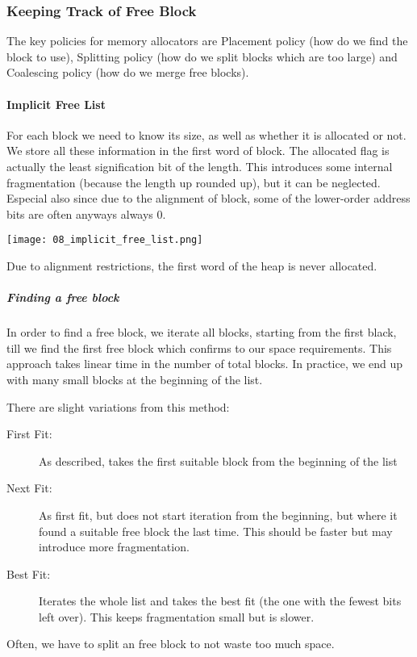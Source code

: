 \subsubsection{Keeping Track of Free Block}
The key policies for memory allocators are Placement policy (how do we find the block to use), Splitting policy (how do we split blocks which are too large) and Coalescing policy (how do we merge free blocks).

\paragraph{Implicit Free List}
For each block we need to know its size, as well as whether it is allocated or not. We store all these information in the first word of block. The allocated flag is actually the least signification bit of the length. This introduces some internal fragmentation (because the length up rounded up), but it can be neglected. Especial also since due to the alignment of block, some of the lower-order address bits are often anyways always $0$.

\texttt{[image: 08\_implicit\_free\_list.png]}

Due to alignment restrictions, the first word of the heap is never allocated.

\subparagraph{Finding a free block}
In order to find a free block, we iterate all blocks, starting from the first black, till we find the first free block which confirms to our space requirements. This approach takes linear time in the number of total blocks. In practice, we end up with many small blocks at the beginning of the list.

There are slight variations from this method:
\begin{description}
    \item[First Fit:] As described, takes the first suitable block from the beginning of the list
    \item[Next Fit:] As first fit, but does not start iteration from the beginning, but where it found a suitable free block the last time. This should be faster but may introduce more fragmentation.
    \item[Best Fit:] Iterates the whole list and takes the best fit (the one with the fewest bits left over). This keeps fragmentation small but is slower.
\end{description}

Often, we have to split an free block to not waste too much space.

